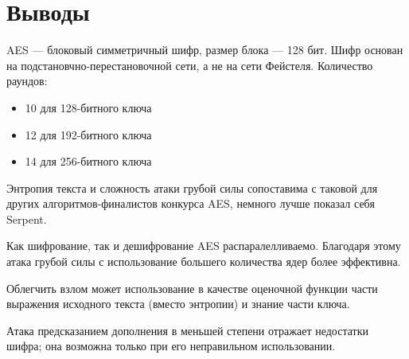 \documentclass[a4paper, 14pt]{extarticle}
\begin{document}
\newpage
\section*{Выводы}
AES --- блоковый симметричный шифр, размер блока --- 128 бит. Шифр основан на подстановчно-перестановочной сети, а не на сети Фейстеля. Количество раундов:
\begin{itemize}
    \item 10 для 128-битного ключа
    \item 12 для 192-битного ключа
    \item 14 для 256-битного ключа\\
\end{itemize}

Энтропия текста и сложность атаки грубой силы сопоставима с таковой для других алгоритмов-финалистов конкурса AES, немного лучше показал себя Serpent.

Как шифрование, так и дешифрование AES распаралелливаемо. Благодаря этому атака грубой силы с использование большего количества ядер более эффективна.

Облегчить взлом может использование в качестве оценочной функции части выражения исходного текста (вместо энтропии) и знание части ключа.

Атака предсказанием дополнения в меньшей степени отражает недостатки шифра; она возможна только при его неправильном использовании.
\end{document}

